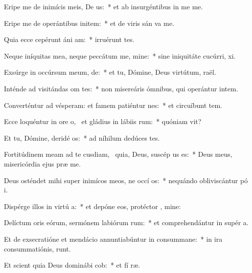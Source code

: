 \item Eripe me de inimícis meis, De us:~* et ab insurgéntibus in me  me.
\item Eripe me de operántibus initem:~* et de viris sán va me.
\item Quia ecce cepérunt áni am:~* irruérunt   tes.
\item Neque iníquitas mea, neque peccátum me, mine:~* sine iniquitáte cucúrri,  xi.
\item Exsúrge in occúrsum meum,  de:~* et tu, Dómine, Deus virtútum,  raël.
\item Inténde ad visitándas om tes:~* non misereáris ómnibus, qui operántur intem.
\item Converténtur ad vésperam: et famem patiéntur  nes:~* et circuíbunt tem.
\item Ecce loquéntur in ore o,~\pscross{} et gládius in lábiis rum:~* quóniam  vit?
\item Et tu, Dómine, deridé os:~* ad níhilum dedúces  tes.
\item Fortitúdinem meam ad te cusdiam,~\pscross{} quia, Deus, suscép us es:~* Deus meus, misericórdia ejus præ me.
\item Deus osténdet mihi super inimícos meos, ne occí os:~* nequándo obliviscántur pó i.
\item Dispérge illos in virtú a:~* et depóne eos, protéctor , mine:
\item Delíctum oris eórum, sermónem labiórum rum:~* et comprehendántur in supér a.
\item Et de exsecratióne et mendácio annuntiabúntur in consummane:~* in ira consummatiónis,   runt.
\item Et scient quia Deus dominábi cob:~* et fí ræ.
